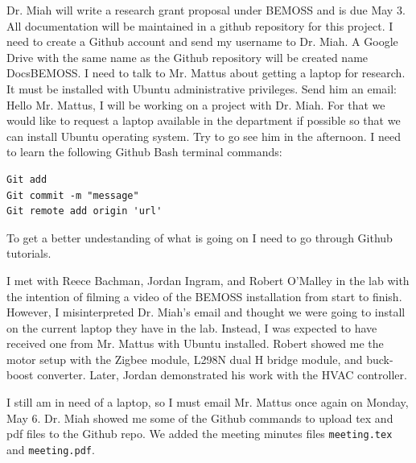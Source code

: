 \documentclass[fontsize=11pt, %
                             paper=letter, %
                             twoside, %
                             captions=tableheading,
                             index=totoc,
                             hyperref]{labbook}
\begin{document}
\begin{addmargin}[0cm]{0cm} %

\pagestyle{scrheadings} %

Dr. Miah will write a research grant proposal under BEMOSS and is due May 3.
\bigbreak\noindent
All documentation will be maintained in a github repository for this project.
I need to create a Github account and send my username to Dr. Miah. A Google Drive with the same name as the Github repository will be created name DocsBEMOSS.
\bigbreak\noindent
I need to talk to Mr. Mattus about getting a laptop for research. It must be installed with Ubuntu administrative privileges. 
\bigbreak\noindent
Send him an email:
\bigbreak\noindent
Hello Mr. Mattus, I will be working on a project with Dr. Miah. For that we would like to request a laptop available in the department if possible so that we can install Ubuntu operating system. 
\bigbreak\noindent
Try to go see him in the afternoon.
\bigbreak\noindent
I need to learn the following Github Bash terminal commands:
\begin{verbatim}
Git add
Git commit -m "message"
Git remote add origin 'url'
\end{verbatim}
To get a better undestanding of what is going on I need to go through Github tutorials.

I met with Reece Bachman, Jordan Ingram, and Robert O'Malley in the lab with the intention of filming a video of the BEMOSS installation from start to finish. However, I misinterpreted Dr. Miah's email and thought we were going to install on the current laptop they have in the lab. Instead, I was expected to have received one from Mr. Mattus with Ubuntu installed. Robert showed me the motor setup with the Zigbee module, L298N dual H bridge module, and buck-boost converter. Later, Jordan demonstrated his work with the HVAC controller.

I still am in need of a laptop, so I must email Mr. Mattus once again on Monday, May 6.
\bigbreak\noindent
Dr. Miah showed me some of the Github commands to upload tex and pdf files to the Github repo. We added the meeting minutes files \texttt{meeting.tex} and \texttt{meeting.pdf}.


\end{addmargin}
\end{document}
